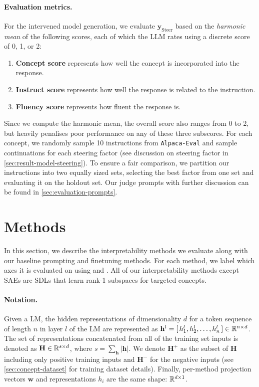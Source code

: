 \documentclass{article}
\theoremstyle{plain}
\theoremstyle{definition}
\theoremstyle{remark}
\newcommand{\methodtag}[2]{%
  \tikz[baseline=(char.base)]{%
    \node[
      fill=#1,
      rounded corners=2pt,
      text=white,
      font=\bfseries,
      minimum width=1em,
      minimum height=1em,
      align=center,
      inner sep=0pt
    ](char){#2};%
  }%
}
\newcommand{\concepttag}{\protect\methodtag{conceptcolor}{C}}
\newcommand{\steeringtag}{\protect\methodtag{steeringcolor}{S}}
\begin{document}
\paragraph{Evaluation metrics.} For the intervened model generation, we evaluate \(\hat{\mathbf{y}}_{\text{Steer}}\) based on the \emph{harmonic mean} of the following scores, each of which the LLM rates using a discrete score of 0, 1, or 2:
\begin{enumerate}
    \item \textbf{Concept score} represents how well the concept is incorporated into the response.
    \item \textbf{Instruct score} represents how well the response is related to the instruction.
    \item \textbf{Fluency score} represents how fluent the response is.
\end{enumerate}
Since we compute the harmonic mean, the overall score also ranges from 0 to 2, but heavily penalises poor performance on any of these three subscores. For each concept, we randomly sample 10 instructions from \texttt{Alpaca-Eval} and sample continuations for each steering factor (see discussion on steering factor in \cref{sec:result-model-steering}).
To ensure a fair comparison, we partition our instructions into two equally sized sets, selecting the best factor from one set and evaluating it on the holdout set.
Our judge prompts with further discussion can be found in \cref{sec:evaluation-prompts}.

\section{Methods}\label{sec:methods}
In this section, we describe the interpretability methods we evaluate along with our baseline prompting and finetuning methods. For each method, we label which axes it is evaluated on using \concepttag{} and \steeringtag{}. All of our interpretability methods except SAEs are SDLs that learn rank-1 subspaces for targeted concepts.

\paragraph{Notation.} Given a LM, the hidden representations of dimensionality $d$ for a token sequence of length $n$ in layer $l$ of the LM are represented as \(\mathbf{h}^{l} = [\,h_1^l, h_2^l, \ldots, h_n^l\,] \in \mathbb{R}^{n \times d}\). The set of representations concatenated from all of the training set inputs is denoted as $\mathbf{H} \in \mathbb{R}^{s \times d}$, where $s = \sum_{\mathbf{h}}\lvert\mathbf{h}\rvert$. We denote $\mathbf{H}^{+}$ as the subset of $\mathbf{H}$ including only positive training inputs and $\mathbf{H}^{-}$ for the negative inputs (see \cref{sec:concept-dataset} for training dataset details). Finally, per-method projection vectors $\mathbf{w}$ and representations $h_i$ are the same shape: $\mathbb{R}^{d \times 1}$.
\end{document}
